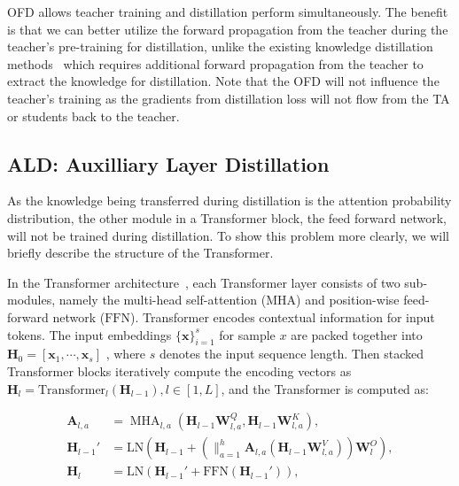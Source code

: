 OFD allows teacher training and distillation perform simultaneously. The benefit is that we can better utilize the forward propagation from the teacher during the teacher's pre-training for distillation, unlike the existing knowledge distillation methods~\cite{tinybert,distill-bert} which requires additional forward propagation from the teacher to extract the knowledge for distillation. Note that the OFD will not influence the teacher's training as the gradients from distillation loss will not flow from the TA or students back to the teacher.  

\subsection{ALD: Auxilliary Layer Distillation} As the knowledge being transferred during distillation is the attention probability distribution, the other module in a Transformer block, the feed forward network, will not be trained during distillation. To show this problem more clearly, we will briefly describe the structure of the Transformer. 

In the Transformer architecture~\cite{vaswani2017attention}, each Transformer layer consists of two sub-modules, namely the multi-head self-attention ($\mathrm{MHA}$) and position-wise feed-forward network ($\mathrm{FFN}$). Transformer encodes contextual information for input tokens. The input embeddings $\{\mathbf{x}\}^{s}_{i=1}$ for sample $x$ are packed together into
$\mathbf{H}_{0}=\left[\mathbf{x}_{1}, \cdots, \mathbf{x}_{s}\right ] $ , where $s$ denotes the input sequence length. Then stacked Transformer blocks iteratively compute  the encoding vectors as $\mathbf{H}_{l}=\mathrm { Transformer }_{l}\left(\mathbf{H}_{l-1}\right), l \in[1, L]$, and the Transformer is computed as:

\begin{align}
\mathbf{A}_{l, a}&=\operatorname{MHA}_{l, a}(
\mathbf{H}_{l-1} \mathbf{W}_{l, a}^{Q}, \mathbf{H}_{l-1} \mathbf{W}_{l, a}^{K}), \label{mha-att}\\
\mathbf{H}_{l-1}' & = \text {LN}(\mathbf{H}_{l-1}+ (\mathop{\|}_{a=1}^h \mathbf{A}_{l, a}  (\mathbf{H}_{l-1} \mathbf{W}_{l, a}^{V})) \mathbf{W}_{l}^{O}) , \label{mha-res}\\
\mathbf{H}_{l}\  & = \text {LN}\left(\mathbf{H}_{l-1}'+\mathrm{FFN}\left(\mathbf{H}_{l-1}'\right)\right),
\label{mha-ffn}
\end{align}

